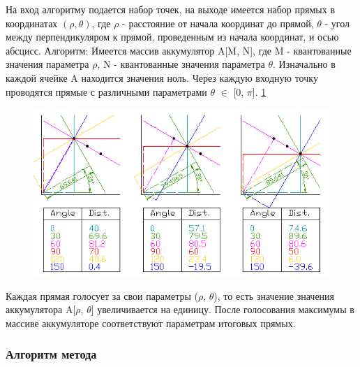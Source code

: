 На вход алгоритму подается набор точек, на выходе имеется набор прямых в координатах $(\rho, \theta)$, где $\rho$ - расстояние от начала координат до прямой, $\theta$ - угол между перпендикуляром к прямой, проведенным из начала координат, и осью абсцисс.
\newline
Алгоритм:
\newline
Имеется массив аккумулятор A[M, N], где M - квантованные значения параметра $\rho$, N - квантованные значения параметра $\theta$. Изначально в каждой ячейке A находится значения ноль.
\newline
Через каждую входную точку проводятся прямые с различными параметрами $\theta$ $\in$ [0, $\pi$]. \ref{fig:hough1}

\begin{figure}[h!]
	\centering
	\includegraphics[width=0.7\linewidth]{pictures/hough1}
	\caption[Алгоритм Хафа]{}
	\label{fig:hough1}
\end{figure}

Каждая прямая голосует за свои параметры ($\rho$, $\theta$), то есть значение значения аккумулятора A[$\rho$, $\theta$] увеличивается на единицу. 
После голосования максимумы в массиве аккумуляторе соответствуют параметрам итоговых прямых. 

\subsubsection{Алгоритм метода}

